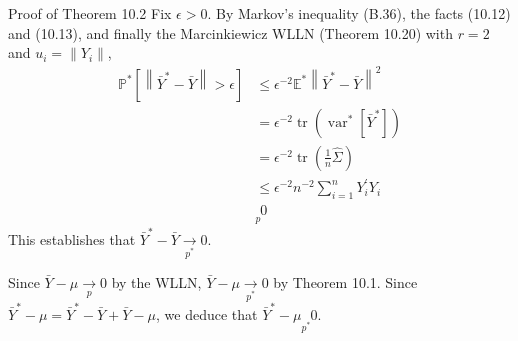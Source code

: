 \documentclass[10pt]{article}
\begin{document}
Proof of Theorem 10.2 Fix $\epsilon>0$. By Markov's inequality (B.36), the facts (10.12) and (10.13), and finally the Marcinkiewicz WLLN (Theorem 10.20) with $r=2$ and $u_{i}=\left\|Y_{i}\right\|$,
$$
\begin{aligned}
\mathbb{P}^{*}\left[\left\|\bar{Y}^{*}-\bar{Y}\right\|>\epsilon\right] & \leq \epsilon^{-2} \mathbb{E}^{*}\left\|\bar{Y}^{*}-\bar{Y}\right\|^{2} \\
&=\epsilon^{-2} \operatorname{tr}\left(\operatorname{var}^{*}\left[\bar{Y}^{*}\right]\right) \\
&=\epsilon^{-2} \operatorname{tr}\left(\frac{1}{n} \widehat{\Sigma}\right) \\
& \leq \epsilon^{-2} n^{-2} \sum_{i=1}^{n} Y_{i}^{\prime} Y_{i} \\
& \underset{p}{ } 0
\end{aligned}
$$
This establishes that $\bar{Y}^{*}-\bar{Y} \underset{p^{*}}{\longrightarrow} 0$.

Since $\bar{Y}-\mu \underset{p}{\longrightarrow} 0$ by the WLLN, $\bar{Y}-\mu \underset{p^{*}}{\longrightarrow} 0$ by Theorem 10.1. Since $\bar{Y}^{*}-\mu=\bar{Y}^{*}-\bar{Y}+\bar{Y}-\mu$, we deduce that $\bar{Y}^{*}-\mu \underset{p^{*}}{ } 0$.
\end{document}
